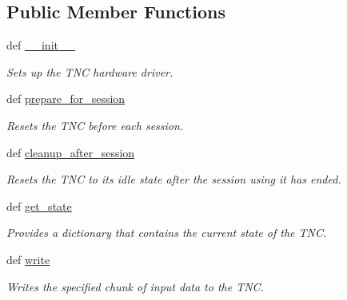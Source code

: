 \subsection*{Public Member Functions}
\begin{DoxyCompactItemize}
\item 
def \hyperlink{classhwm_1_1hardware_1_1devices_1_1drivers_1_1kantronics__tnc_1_1kantronics__tnc_1_1_kantronics___t_n_c_aca9ca4923a0f8592f5622ab8530808e3}{\-\_\-\-\_\-init\-\_\-\-\_\-}
\begin{DoxyCompactList}\small\item\em Sets up the T\-N\-C hardware driver. \end{DoxyCompactList}\item 
def \hyperlink{classhwm_1_1hardware_1_1devices_1_1drivers_1_1kantronics__tnc_1_1kantronics__tnc_1_1_kantronics___t_n_c_a94214de15f97f949d0f70cf59b26ea28}{prepare\-\_\-for\-\_\-session}
\begin{DoxyCompactList}\small\item\em Resets the T\-N\-C before each session. \end{DoxyCompactList}\item 
\hypertarget{classhwm_1_1hardware_1_1devices_1_1drivers_1_1kantronics__tnc_1_1kantronics__tnc_1_1_kantronics___t_n_c_adb66d89d127728ed7b6a1c20e61242f2}{def \hyperlink{classhwm_1_1hardware_1_1devices_1_1drivers_1_1kantronics__tnc_1_1kantronics__tnc_1_1_kantronics___t_n_c_adb66d89d127728ed7b6a1c20e61242f2}{cleanup\-\_\-after\-\_\-session}}\label{classhwm_1_1hardware_1_1devices_1_1drivers_1_1kantronics__tnc_1_1kantronics__tnc_1_1_kantronics___t_n_c_adb66d89d127728ed7b6a1c20e61242f2}

\begin{DoxyCompactList}\small\item\em Resets the T\-N\-C to its idle state after the session using it has ended. \end{DoxyCompactList}\item 
def \hyperlink{classhwm_1_1hardware_1_1devices_1_1drivers_1_1kantronics__tnc_1_1kantronics__tnc_1_1_kantronics___t_n_c_a5e6c5bb6bd4dfd1deb5e9c34492f8e8b}{get\-\_\-state}
\begin{DoxyCompactList}\small\item\em Provides a dictionary that contains the current state of the T\-N\-C. \end{DoxyCompactList}\item 
def \hyperlink{classhwm_1_1hardware_1_1devices_1_1drivers_1_1kantronics__tnc_1_1kantronics__tnc_1_1_kantronics___t_n_c_aece51eff1bff2fd5e3bc1b3ebbbce1fa}{write}
\begin{DoxyCompactList}\small\item\em Writes the specified chunk of input data to the T\-N\-C. \end{DoxyCompactList}\end{DoxyCompactItemize}
